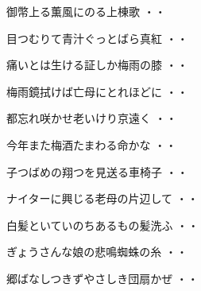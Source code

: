 \vspace{0.6cm}
\begin{shiika}御幣上る薫風にのる上棟歌
\hfill{・・}\end{shiika}
\vspace{0.6cm}
\begin{shiika}目つむりて青汁ぐっとばら真紅
\hfill{・・}\end{shiika}
\vspace{0.6cm}
\begin{shiika}痛いとは生ける証しか梅雨の膝
\hfill{・・}\end{shiika}
\vspace{0.6cm}
\begin{shiika}梅雨鏡拭けば亡母にとれほどに
\hfill{・・}\end{shiika}
\vspace{0.6cm}
\begin{shiika}都忘れ咲かせ老いけり京遠く
\hfill{・・}\end{shiika}
\vspace{0.6cm}
\begin{shiika}今年また梅酒たまわる命かな
\hfill{・・}\end{shiika}
\vspace{0.6cm}
\begin{shiika}子つばめの翔つを見送る車椅子
\hfill{・・}\end{shiika}
\vspace{0.6cm}
\begin{shiika}ナイターに興じる老母の片辺して
\hfill{・・}\end{shiika}
\vspace{0.6cm}
\begin{shiika}白髪といていのちあるもの髪洗ふ
\hfill{・・}\end{shiika}
\vspace{0.6cm}
\begin{shiika}ぎょうさんな娘の悲鳴蜘蛛の糸
\hfill{・・}\end{shiika}
\vspace{0.6cm}
\begin{shiika}郷ばなしつきずやさしき団扇かぜ
\hfill{・・}\end{shiika}
